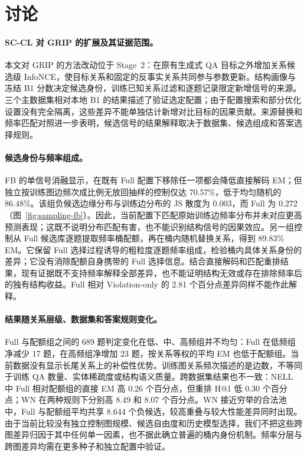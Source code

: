 \section{讨论}
\label{sec:comparison-scope}

\paragraph{SC-CL 对 GRIP 的扩展及其证据范围。}
本文对 GRIP 的方法改动位于 Stage~2：在原有生成式 QA 目标之外增加关系候选级 InfoNCE，使目标关系和固定的反事实关系共同参与参数更新。结构画像与冻结 B1 分数决定候选身份，训练已知关系过滤和逐题记录限定新增信号的来源。三个主数据集相对本地 B1 的结果描述了验证选定配置；由于配置搜索和部分优化设置没有完全隔离，这些差异不能单独估计新增对比目标的因果贡献。来源替换和频率匹配对照进一步表明，候选信号的结果解释取决于数据集、候选组成和答案选择规则。

\paragraph{候选身份与频率组成。}
FB 的单信号消融显示，在既有 Full 配置下移除任一项都会降低直接解码 EM；但独立按训练图边频次成比例无放回抽样的控制仅达 70.57\%，低于均匀随机的 86.48\%。该组负候选边缘分布与训练边分布的 JS 散度为 0.003，而 Full 为 0.272（图~\ref{fig:sampling-fb}）。因此，当前配置下匹配原始训练边频率分布并未对应更高预测表现；这既不说明分布匹配有害，也不能识别结构信号的因果效应。另一组控制从 Full 候选库逐题提取频率桶配额，再在桶内随机替换关系，得到 89.83\% EM。它保留 Full 选择过程诱导的粗粒度逐题频率组成，检验桶内具体关系身份的差异；它没有消除配额自身携带的 Full 选择信息。结合直接解码和匹配重排结果，现有证据既不支持频率解释全部差异，也不能证明结构无效或存在排除频率后的独有结构收益。Full 相对 Violation-only 的 2.81 个百分点差异同样不能作此解释。

\paragraph{结果随关系层级、数据集和答案规则变化。}
Full 与配额组之间的 689 题判定变化在低、中、高频组并不均匀：Full 在低频组净减少 17 题，在高频组净增加 23 题，按关系等权的平均 EM 也低于配额组。当前数据没有显示长尾关系上的补偿性优势。训练图关系频次描述的是边数，不等同于训练 QA 数量、实体稀疏度或结构语义质量。跨数据集结果也不一致：NELL 中 Full 相对配额组的直接 EM 高 0.26 个百分点，但重排 H@1 低 0.30 个百分点；WN 在两种规则下分别高 8.49 和 8.07 个百分点。WN 接近穷举的合法池中，Full 与配额组平均共享 8.644 个负候选，较高重叠与较大性能差异同时出现。由于当前比较没有独立控制图规模、候选自由度和历史模型选择，我们不把这些跨图差异归因于其中任何单一因素，也不据此确立普遍的桶内身份机制。频率分层与跨图差异均需在更多种子和独立配置中验证。

